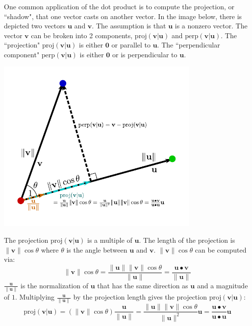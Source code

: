 \documentclass{article}
\begin{document}
One common application of the dot product is to compute the projection, or ``shadow", that one vector casts on another vector. In the image below, there is depicted two vectors \(\mathbf{u}\) and \(\mathbf{v}\). The assumption is that \(\mathbf{u}\) is a nonzero vector. The vector \(\mathbf{v}\) can be broken into 2 components, \(\text{proj}(\mathbf{v}|\mathbf{u})\) and \(\text{perp}(\mathbf{v}|\mathbf{u})\). The ``projection" \(\text{proj}(\mathbf{v}|\mathbf{u})\) is either \(\mathbf{0}\) or parallel to \(\mathbf{u}\). The ``perpendicular component" \(\text{perp}(\mathbf{v}|\mathbf{u})\) is either \(\mathbf{0}\) or is perpendicular to \(\mathbf{u}\).

\begin{center}
\includegraphics[width = 0.75\textwidth]{displacement_vector_proj_and_perp}
\end{center}

The projection \(\text{proj}(\mathbf{v}|\mathbf{u})\) is a multiple of \(\mathbf{u}\). The length of the projection is \(\|\mathbf{v}\|\cos\theta\) where \(\theta\) is the angle between \(\mathbf{u}\) and \(\mathbf{v}\). \(\|\mathbf{v}\|\cos\theta\) can be computed via:
\[\|\mathbf{v}\|\cos\theta = \frac{\|\mathbf{u}\|\|\mathbf{v}\|\cos\theta}{\|\mathbf{u}\|} = \frac{\mathbf{u} \bullet \mathbf{v}}{\|\mathbf{u}\|}\]
\(\frac{\mathbf{u}}{\|\mathbf{u}\|}\) is the normalization of \(\mathbf{u}\) that has the same direction as \(\mathbf{u}\) and a magnitude of \(1\). Multiplying \(\frac{\mathbf{u}}{\|\mathbf{u}\|}\) by the projection length gives the projection \(\text{proj}(\mathbf{v}|\mathbf{u})\):
\[\text{proj}(\mathbf{v}|\mathbf{u}) = (\|\mathbf{v}\|\cos\theta)\frac{\mathbf{u}}{\|\mathbf{u}\|} = \frac{\|\mathbf{u}\|\|\mathbf{v}\|\cos\theta}{\|\mathbf{u}\|^2}\mathbf{u} = \frac{\mathbf{u} \bullet \mathbf{v}}{\mathbf{u} \bullet \mathbf{u}}\mathbf{u}\]
\end{document}
